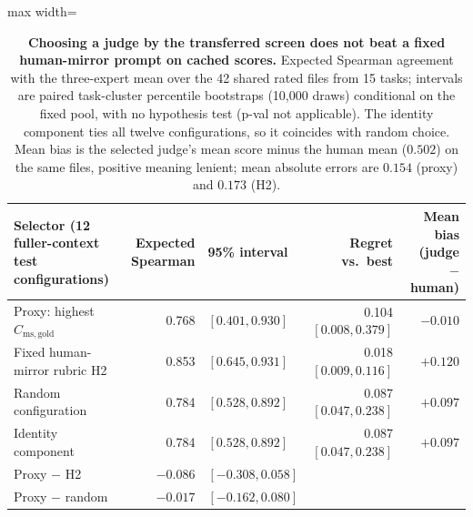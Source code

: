 \begin{table}[t]
\centering\small
\begin{adjustbox}{max width=\linewidth}
\begin{tabular}{@{}lrlrr@{}}
\toprule
Selector (12 fuller-context test configurations) & Expected Spearman & 95\% interval & Regret vs.\ best & Mean bias (judge $-$ human) \\
\midrule
Proxy: highest $C_{\mathrm{ms,gold}}$ & 0.768 & $[0.401, 0.930]$ & 0.104 $[0.008, 0.379]$ & $-0.010$ \\
Fixed human-mirror rubric H2 & 0.853 & $[0.645, 0.931]$ & 0.018 $[0.009, 0.116]$ & $+0.120$ \\
Random configuration & 0.784 & $[0.528, 0.892]$ & 0.087 $[0.047, 0.238]$ & $+0.097$ \\
Identity component & 0.784 & $[0.528, 0.892]$ & 0.087 $[0.047, 0.238]$ & $+0.097$ \\
\midrule
Proxy $-$ H2 & $-0.086$ & $[-0.308, 0.058]$ & & \\
Proxy $-$ random & $-0.017$ & $[-0.162, 0.080]$ & & \\
\bottomrule
\end{tabular}
\end{adjustbox}
\caption{\textbf{Choosing a judge by the transferred screen does not beat a fixed human-mirror prompt on cached scores.} Expected Spearman agreement with the three-expert mean over the 42 shared rated files from 15 tasks; intervals are paired task-cluster percentile bootstraps (10{,}000 draws) conditional on the fixed pool, with no hypothesis test (p-val not applicable).
The identity component ties all twelve configurations, so it coincides with random choice.
Mean bias is the selected judge's mean score minus the human mean ($0.502$) on the same files, positive meaning lenient; mean absolute errors are $0.154$ (proxy) and $0.173$ (H2).}
\label{tab:selection-utility}
\end{table}


